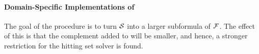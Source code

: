 


\paragraph{Domain-Specific Implementations of \grow} \label{para:domainspecificgrow}

The goal of the \grow procedure is to turn $\mathcal{S}$ into a larger subformula of $\mathcal{F} $. The effect of this is that the complement added to \setstohit will be smaller, and hence, a stronger restriction for the hitting set solver is found.  

